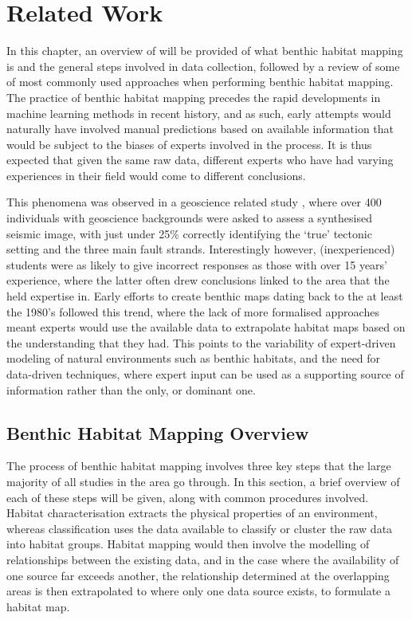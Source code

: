 \chapter{Related Work} \label{chap:relatedwork}

In this chapter, an overview of will be provided of what benthic habitat mapping is and the general steps involved in data collection, followed by a review of some of most commonly used approaches when performing benthic habitat mapping. The practice of benthic habitat mapping precedes the rapid developments in machine learning methods in recent history, and as such, early attempts would naturally have involved manual predictions based on available information that would be subject to the biases of experts involved in the process. It is thus expected that given the same raw data, different experts who have had varying experiences in their field would come to different conclusions. 

This phenomena was observed in a geoscience related study \citep{bond07}, where over 400 individuals with geoscience backgrounds were asked to assess a synthesised seismic image, with just under 25\% correctly identifying the `true' tectonic setting and the three main fault strands. Interestingly however, (inexperienced) students were as likely to give incorrect responses as those with over 15 years' experience, where the latter often drew conclusions linked to the area that the held expertise in. Early efforts to create benthic maps dating back to the at least the 1980's\citep{gibson07} followed this trend, where the lack of more formalised approaches meant experts would use the available data to extrapolate habitat maps based on the understanding that they had. This points to the variability of expert-driven modeling of natural environments such as benthic habitats, and the need for data-driven techniques, where expert input can be used as a supporting source of information rather than the only, or dominant one. 

\section{Benthic Habitat Mapping Overview}

The process of benthic habitat mapping involves three key steps that the large majority of all studies in the area go through\citep{ozcoasts}. In this section, a brief overview of each of these steps will be given, along with common procedures involved. Habitat characterisation extracts the physical properties of an environment, whereas classification uses the data available to classify or cluster the raw data into habitat groups. Habitat mapping would then involve the modelling of relationships between the existing data, and in the case where the availability of one source far exceeds another, the relationship determined at the overlapping areas is then extrapolated to where only one data source exists, to formulate a habitat map.

